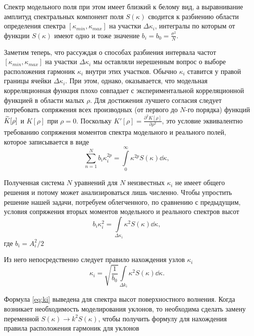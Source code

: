 Спектр модельного поля при этом имеет близкий к белому вид, а выравнивание
амплитуд спектральных компонент поля $S(\kappa)$ сводится к разбиению области
определения спектра $[\kappa_{min},\kappa_{max}]$ на участки $\Delta
\kappa_i$, интегралы по
которым от функции  $S(\kappa)$ имеют одно и тоже значение $b_i = b_{0} =
\frac{\sigma^2}{N}$.

Заметим теперь, что рассуждая о способах разбиения интервала частот
$[\kappa_{min},
\kappa_{max}]$ на участки $\Delta \kappa_i$ мы оставляли нерешенным вопрос о выборе
расположения гармоник $\kappa_i$ внутри этих участков. Обычно  $\kappa_i$ ставится у
правой границы ячейки  $\Delta \kappa_i$. При этом, однако, оказывается, что
модельная корреляционная функция плохо совпадает с экспериментальной
корреляционной функцией в области малых  $\rho$. Для достижения лучшего
согласия следует потребовать сопряжения всех производных (от первого до $N$-го
порядка) функций $\widetilde K[\rho]$ и  $K[\rho]$ при  $\rho=0$. 
Поскольку $K'[\rho] = \frac{\partial^2 K[\rho]}{\partial \rho^2}$, это условие эквивалентно
требованию сопряжения моментов спектра модельного и реального полей, которое
записывается в виде
 \begin{equation}
    \sum\limits_{n=1}^{N} b_i \kappa_i^{2p} 
    = \int\limits_{0}^{\infty} \kappa^{2p}S(\kappa) \dd \kappa, 
\end{equation}

Полученная система $N$ уравнений для $N$ неизвестных $\kappa_i$ не имеет общего
решения и потому может анализироваться лишь численно. Чтобы упростить решение
нашей задачи, потребуем облегченного, по сравнению с предыдущим, условия
сопряжения вторых моментов модельного и реального спектров высот
 \begin{equation}
    b_i \kappa_i^2 = \int\limits_{\Delta \kappa_i} \kappa^2 S(\kappa) \dd \kappa,
\end{equation}
где $b_i= A_i^2 / 2$

Из него непосредственно следует правило нахождения узлов $\kappa_i$ 
\begin{equation}
    \label{eq:ki}
    \boxed{
        \kappa_i = \sqrt{\frac{1}{b_0}} \int\limits_{\Delta k_i} \kappa^2
        S(\kappa) \dd \kappa. 
    }
\end{equation}

Формула \eqref{eq:ki} выведена для спектра высот поверхностного волнения. Когда
возникает необходимость моделирования уклонов, то необходима сделать замену
переменной $S(\kappa) \to k^2 S(\kappa)$, чтобы получить формулу для нахождения правила
расположения гармоник для уклонов


